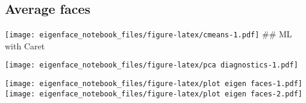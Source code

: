 \documentclass[]{article}
\newenvironment{Shaded}{\begin{snugshade}}{\end{snugshade}}
\newcommand{\KeywordTok}[1]{\textcolor[rgb]{0.13,0.29,0.53}{\textbf{#1}}}
\newcommand{\DataTypeTok}[1]{\textcolor[rgb]{0.13,0.29,0.53}{#1}}
\newcommand{\OtherTok}[1]{\textcolor[rgb]{0.56,0.35,0.01}{#1}}
\newcommand{\OperatorTok}[1]{\textcolor[rgb]{0.81,0.36,0.00}{\textbf{#1}}}
\newcommand{\NormalTok}[1]{#1}
\begin{document}
\subsection{Average faces}\label{average-faces}

\texttt{[image: eigenface\_notebook\_files/figure-latex/cmeans-1.pdf]}
\#\# ML with Caret

\begin{Shaded}
\end{Shaded}

\texttt{[image: eigenface\_notebook\_files/figure-latex/pca diagnostics-1.pdf]}

\texttt{[image: eigenface\_notebook\_files/figure-latex/plot eigen faces-1.pdf]}
\texttt{[image: eigenface\_notebook\_files/figure-latex/plot eigen faces-2.pdf]}
\end{document}
